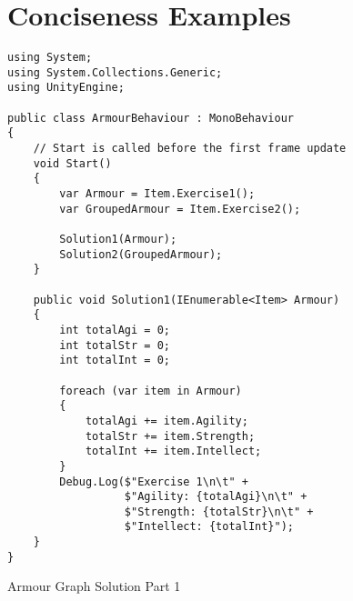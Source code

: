 \chapter{Conciseness Examples} \label{app:terse-diff-comp}
\begin{listing}[H]
\begin{verbatim}
using System;
using System.Collections.Generic;
using UnityEngine;

public class ArmourBehaviour : MonoBehaviour
{
    // Start is called before the first frame update
    void Start()
    {
        var Armour = Item.Exercise1();
        var GroupedArmour = Item.Exercise2();

        Solution1(Armour);
        Solution2(GroupedArmour);
    }

    public void Solution1(IEnumerable<Item> Armour)
    {
        int totalAgi = 0;
        int totalStr = 0;
        int totalInt = 0;

        foreach (var item in Armour)
        {
            totalAgi += item.Agility;
            totalStr += item.Strength;
            totalInt += item.Intellect;
        }
        Debug.Log($"Exercise 1\n\t" +
                  $"Agility: {totalAgi}\n\t" +
                  $"Strength: {totalStr}\n\t" +
                  $"Intellect: {totalInt}");
    }
}

\end{verbatim}
\caption{Armour Graph \cs Solution Part 1}
\label{lst:armour-graph-cs-1}
\end{listing}

